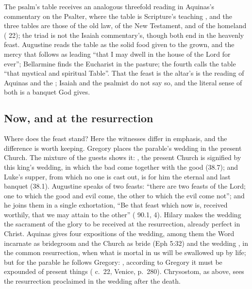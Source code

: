 The psalm's table receives an analogous threefold reading in Aquinas's
commentary on the Psalter, where the table is Scripture's teaching , and the three tables are those of the
old law, of the New Testament, and of the homeland ( 22); the triad is not the Isaiah commentary's, though both end in
the heavenly feast. Augustine reads the table as the solid food given to the grown, and the
mercy that follows as leading ``that I may dwell in the house of the Lord for
ever''; Bellarmine finds the Eucharist in the pasture; the fourth
 calls the table ``that mystical and spiritual
Table''. That the feast is the altar's is the reading of Aquinas and the
; Isaiah and the psalmist do not say so, and the literal
sense of both is a banquet God gives.

\subsection{Now, and at the resurrection}

Where does the feast stand? Here the witnesses differ in emphasis, and the
difference is worth keeping. Gregory places the parable's wedding in the
present Church. The mixture of the guests shows it: ,
the present Church is signified by this king's wedding, in which the bad come
together with the good (38.7); and Luke's supper, from which no one is cast
out, is for him the eternal and last banquet (38.1). Augustine speaks of two
feasts: ``there are two feasts of the Lord; one to which the good and evil
come, the other to which the evil come not''; and he joins them in a single
exhortation, ``Be that feast which now is, received worthily, that we may
attain to the other'' ( 90.1, 4). Hilary makes the wedding the
sacrament of the glory to be received at the resurrection, already perfect in
Christ. Aquinas gives four expositions of the wedding, among them the Word
incarnate as bridegroom and the Church as bride (Eph 5:32) and the wedding
, in the common resurrection, when what is mortal in us will be swallowed
up by life; but for the parable he follows Gregory: , according to Gregory it must be expounded of
present things ( c.~22, Venice, p.~280). Chrysostom, as
above, sees the resurrection proclaimed in the wedding after the death.

